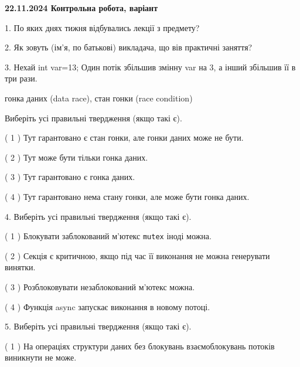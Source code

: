 \documentclass[12pt, ukrainian]{article}
\def\code#1{\Verb!#1!}
\begin{document}
\vspace{4mm}
\newpage
\begin {large}

\textbf{22.11.2024 Контрольна робота, варіант  }\par


{
1. По яких днях тижня відбувались лекції з предмету?



\vspace{5mm}
2. Як зовуть (ім'я, по батькові) викладача, що вів практичні заняття?



\vspace{5mm}
3. Нехай int var=13; Один потік збільшив змінну var на 3, а інший збільшив її в три рази.

гонка даних (data race), стан гонки (race condition)

Виберіть усі правильні твердження (якщо такі є).\par
\vspace{2mm}
( 1 ) Тут гарантовано є стан гонки, але гонки даних може не бути.%

( 2 ) Тут може бути тільки гонка даних.%

( 3 ) Тут гарантовано є гонка даних.%

( 4 ) Тут гарантовано нема стану гонки, але може бути гонка даних.%


\vspace{5mm}
4. Виберіть усі правильні твердження (якщо такі є).\par
\vspace{2mm}

( 1 ) Блокувати заблокований м’ютекс  \code{mutex} іноді можна.%

( 2 ) Секція є критичною, якщо під час її виконання не можна генерувати винятки.%

( 3 ) Розблоковувати незаблокований м’ютекс можна.%

( 4 ) Функція async запускає виконання в новому потоці.%


\vspace{5mm}
5. Виберіть усі правильні твердження (якщо такі є).\par
\vspace{2mm}

( 1 ) На операціях структури даних без блокувань взаємоблокувань потоків виникнути не може.%

}
\end{large}
\end{document}
